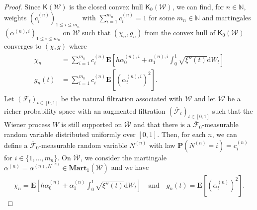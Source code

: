\documentclass[11pt]{amsart}
\theoremstyle{remark}
\theoremstyle{definition}
\numberwithin{equation}{section}
\numberwithin{proposition}{section}
\numberwithin{figure}{section}
\numberwithin{table}{section}
\newcommand{\N}{\mathbb{N}}
\newcommand{\EE}{\mathbf{E}}
\newcommand{\PP}{\mathbf{P}}
\renewcommand{\leq}{\leqslant}
\renewcommand{\bar}{\overline}
\newcommand{\Ll}{\left}
\newcommand{\Rr}{\right}
\renewcommand{\d}{\mathrm{d}}
\newcommand{\1}{\mathbf{1}}
\newcommand{\mcl}{\mathcal}
\newcommand{\msf}{\mathsf}
\newcommand{\msc}{\mathscr}
\newcommand{\bmart}{\mathbf{Mart}}
\newcommand{\pnp}{{(n)}}
\begin{document}
\begin{proof}
Since $\msf K(\msc W)$ is the closed convex hull $\msf K_0(\msc W)$, we can find, for $n\in\N$, weights $\Ll(c^\pnp_i\Rr)_{1\leq i\leq m_n}$ with $\sum_{i=1}^{m_n}c^\pnp_i=1$ for some $m_n\in\N$ and martingales $\Ll(\alpha^{\pnp,i}\Rr)_{1\leq i\leq m_n}$ on $\msc W$ such that $(\chi_n, g_n)$ from the convex hull of $\msf K_0(\msc W)$ converges to $(\chi, g)$ where
\begin{align}\label{e.chi_n=,g_n=}
\begin{split}
    \chi_n&=\sum_{i=1}^{m_n} c^\pnp_i \EE\Ll[h\alpha^{\pnp,i}_0 + \alpha^{\pnp,i}_1\int_0^1\sqrt{\xi''(t)}\d W_t\Rr]
    \\
    g_n(t) & = \sum_{i=1}^{m_n} c^\pnp_i \EE \Ll[\Ll(\alpha^{\pnp,i}_t\Rr)^2\Rr].
\end{split}
\end{align}
Let $(\mcl F_t)_{t\in[0,1]}$ be the natural filtration associated with $\msc W$ and let $\bar{\msc W}$ be a richer probability space with an augmented filtration $\Ll(\bar{\mcl F}_t\Rr)_{t\in[0,1]}$ such that the Wiener process $W$ is still supported on $\bar{\msc W}$ and that there is a $\bar{\mcl F}_0$-measurable random variable distributed uniformly over $[0,1]$. Then, for each $n$, we can define a $\bar{\mcl F}_0$-measurable random variable $N^\pnp$ with law $\PP(N^\pnp=i) = c^\pnp_i$ for $i\in\{1,\dots,m_n\}$. On $\bar{\msc W}$, we consider the martingale $\alpha^\pnp = \alpha^{\pnp, N^\pnp} \in \bmart_1\Ll(\bar{\msc W}\Rr)$ and we have
\begin{align}\label{e.chi_n=,g_n=2}
    \chi_n=\EE\Ll[h\alpha^\pnp_0 + \alpha^\pnp_1\int_0^1\sqrt{\xi''(t)}\d W_t\Rr] \quad\text{and}\quad 
    g_n(t)  =\EE \Ll[\Ll(\alpha^\pnp_t\Rr)^2\Rr].
\end{align}


\end{proof}
\end{document}
